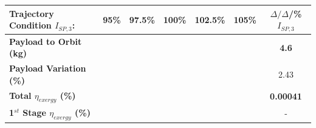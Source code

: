 \begin{table}[ht]
	\centering
	\begin{tabular}{l c c c c c c} 
		\hline \textbf{Trajectory Condition}   \qquad  $I_{SP,3}$:
		&95\%
		&97.5\%
		&100\%
		&102.5\%
		&105\%
		& $\Delta/\Delta$/\%$I_{SP,3}$
		\\
		\hline \textbf{Payload to Orbit (kg)}
		& \textbf{\PayloadToOrbitTThreeNinetyNoReturn}
		& \textbf{\PayloadToOrbitTThreeNinetyFiveNoReturn}
		& \textbf{\PayloadToOrbitTThreeStandardNoReturn}
		& \textbf{\PayloadToOrbitTThreeOneHundredFiveNoReturn}
		& \textbf{\PayloadToOrbitTThreeOneHundredTenNoReturn}
		&\textbf{4.6}
		\\
		\textbf{Payload Variation (\%)}
		& \PayloadVarTThreeNinetyNoReturn
		& \PayloadVarTThreeNinetyFiveNoReturn
		& \PayloadVarTThreeStandardNoReturn
		& \PayloadVarTThreeOneHundredFiveNoReturn
		& \PayloadVarTThreeOneHundredTenNoReturn
		&2.43
		\\
		\textbf{Total $\eta_{exergy}$ (\%)}
		& \textbf{\totalExergyEffTThreeNinetyNoReturn}
		& \textbf{\totalExergyEffTThreeNinetyFiveNoReturn}
		& \textbf{\totalExergyEffTThreeStandardNoReturn}
		& \textbf{\totalExergyEffTThreeOneHundredFiveNoReturn}
		& \textbf{\totalExergyEffTThreeOneHundredTenNoReturn}
		& \textbf{0.00041}
		\\
		\hline 
		\textbf{1$^{st}$ Stage $\eta_{exergy}$ (\%)}
		& \textbf{\firstExergyEffTThreeNinetyNoReturn}
		& \textbf{\firstExergyEffTThreeNinetyFiveNoReturn}
		& \textbf{\firstExergyEffTThreeStandardNoReturn}
		& \textbf{\firstExergyEffTThreeOneHundredFiveNoReturn}
		& \textbf{\firstExergyEffTThreeOneHundredTenNoReturn}
		& -
		\\
	

\end{tabular}
\end{table}
